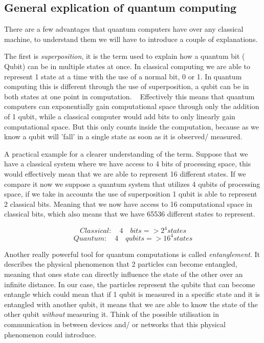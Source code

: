 \subsection{General explication of quantum computing}

There are a few advantages that quantum computers have over any classical machine, to understand them we will have to introduce a couple of explanations.

The first is \emph{superposition}, it is the term used to explain how a quantum bit ( Qubit) can be in multiple states at once. In classical computing we are able to represent 1 state at a time with the use of a normal bit, 0 or 1. In quantum computing this is different through the use of superposition, a qubit can be in both states at one point in computation. ~\autocite{Shor2000} Effectively this means that quantum computers can exponentially gain computational space through only the addition of 1 qubit, while a classical computer would add bits to only linearly gain computational space. But this only counts inside the computation, because as we know a qubit will 'fall' in a single state as soon as it is observed/ measured. \autocite{Rieffel1998}

A practical example for a clearer understanding of the term. Suppose that we have a classical system where we have access to 4 bits of processing space, this would effectively mean that we are able to represent 16 different states. If we compare it now we suppose a quantum system that utilizes 4 qubits of processing space, if we take in accounts the use of superposition 1 qubit is able to represent 2 classical bits. Meaning that we now have access to 16 computational space in classical bits, which also means that we have 65536 different states to represent. 

\begin{equation}
	Classical:\quad 4 \quad bits => 2^{4} states
\end{equation}
\begin{equation}
		Quantum: \quad 4 \quad qubits => 16^{4} states
\end{equation}

Another really powerful tool for quantum computations is called \emph{entanglement}. It describes the physical phenomenon that 2 particles can become entangled, meaning that ones state can directly influence the state of the other over an infinite distance. In our case, the particles represent the qubits that can become entangle which could mean that if 1 qubit is measured in a specific state and it is entangled with another qubit, it means that we are able to know the state of the other qubit \emph{without} measuring it. Think of the possible utilisation in communication in between devices and/ or networks that this physical phenomenon could introduce.

